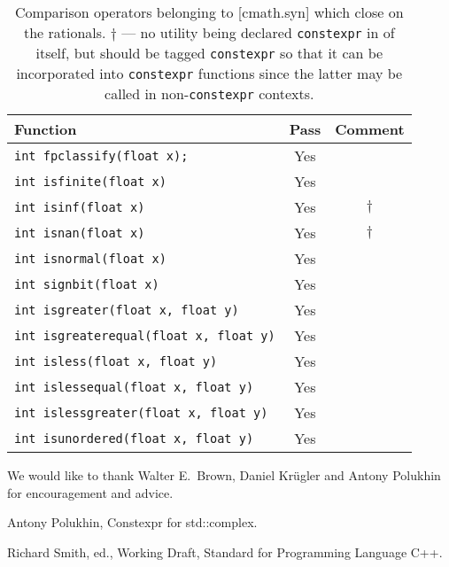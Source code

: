 \documentclass[prd,twocolumn,amsmath,amssymb,nofootinbib,eqsecnum]{revtex4-1}
\newcommand{\constexpr}{\code{constexpr}\xspace}
\newcommand{\code}[1]{{\tt #1}}
\begin{document}
\begin{table}[h]
	\begin{tabular}{lcc}
		Function & Pass & Comment
	\\
	\hline \hline
		\code{int fpclassify(float x);} & Yes &
	\\
	\hline
		\code{int isfinite(float x)} & Yes &
	\\
	\hline
		\code{int isinf(float x)} & Yes & $\dagger$
	\\
	\hline
		\code{int isnan(float x)} & Yes & $\dagger$ 
	\\
	\hline
		\code{int isnormal(float x)} & Yes &
	\\
	\hline
		\code{int signbit(float x)} & Yes &
	\\
	\hline
		\code{int isgreater(float x, float y)} & Yes &
	\\
	\hline
		\code{int isgreaterequal(float x, float y)} & Yes &
	\\
	\hline
		\code{int isless(float x, float y)} & Yes &
	\\
	\hline
		\code{int islessequal(float x, float y)} & Yes &
	\\
	\hline
		\code{int islessgreater(float x, float y)} & Yes &
	\\
	\hline
		\code{int isunordered(float x, float y)} & Yes &
	\end{tabular}
\caption{Comparison operators belonging to [cmath.syn] which close on the rationals. $\dagger$ --- no utility being declared \constexpr in of itself, but should be tagged \constexpr so that it can be incorporated into \constexpr functions since the latter may be called in  non-\constexpr contexts.}
\label{tab:26.9.4}
\end{table}

\begin{acknowledgments}
	We would like to thank Walter E.~Brown, Daniel Kr\"ugler and Antony Polukhin for 
	encouragement and advice.
\end{acknowledgments}


\begin{thebibliography}{1}
	 Antony Polukhin, Constexpr for std::complex.
	
	 Richard Smith, ed., Working Draft, Standard for Programming Language C++.
\end{thebibliography}

\newpage

\onecolumngrid
\end{document}
